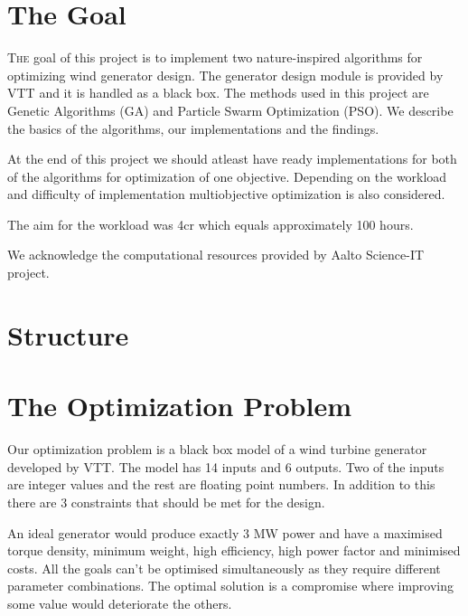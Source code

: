 \documentclass[twoside]{article}
\begin{document}
\begin{multicols}{2} %

\section{The Goal}

\lettrine[nindent=0em,lines=3]{T}{he} goal of this project is to implement two nature-inspired algorithms for optimizing wind generator design. The generator design module is provided by VTT and it is handled as a black box. The methods used in this project are Genetic Algorithms (GA) and Particle Swarm Optimization (PSO). We describe the basics of the algorithms, our implementations and the findings.

At the end of this project we should atleast have ready implementations for both of the algorithms for optimization of one objective. Depending on the workload and difficulty of implementation multiobjective optimization is also considered.

The aim for the workload was 4cr which equals approximately 100 hours.

We acknowledge the computational resources provided by Aalto Science-IT project.





\section{Structure}
\section{The Optimization Problem}
Our optimization problem is a black box model of a wind turbine generator developed by VTT. The model has 14 inputs and 6 outputs. Two of the inputs are integer values and the rest are floating point numbers. In addition to this there are 3 constraints that should be met for the design. 
	
An ideal generator would produce exactly 3 MW power and have a maximised torque density, minimum weight, high efficiency, high power factor and minimised costs. All the goals can't be optimised simultaneously as they require different parameter combinations. The optimal solution is a compromise where improving some value would deteriorate the others.



\end{multicols}
\end{document}
